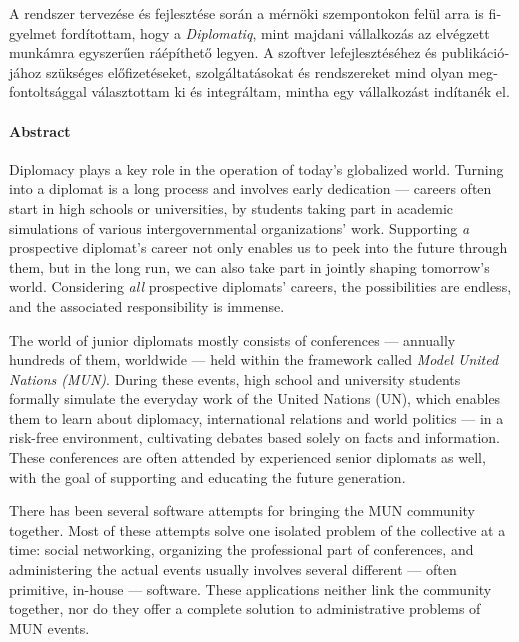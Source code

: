 \begin{otherlanguage}{magyar}
A rendszer tervezése és fejlesztése során a mérnöki szempontokon felül arra is figyelmet fordítottam, hogy a \emph{Diplomatiq}, mint majdani vállalkozás az elvégzett munkámra egyszerűen ráépíthető legyen. A szoftver lefejlesztéséhez és publikációjához szükséges előfizetéseket, szolgáltatásokat és rendszereket mind olyan megfontoltsággal választottam ki és integráltam, mintha egy vállalkozást indítanék el.

\end{otherlanguage}

\clearpage

\paragraph*{Abstract}
{}
\thispagestyle{plain}

Diplomacy plays a key role in the operation of today's globalized world. Turning into a diplomat is a long process and involves early dedication — careers often start in high schools or universities, by students taking part in academic simulations of various intergovernmental organizations' work. Supporting \emph{a} prospective diplomat's career not only enables us to peek into the future through them, but in the long run, we can also take part in jointly shaping tomorrow's world. Considering \emph{all} prospective diplomats' careers, the possibilities are endless, and the associated responsibility is immense.

The world of junior diplomats mostly consists of conferences — annually hundreds of them, worldwide — held within the framework called \emph{Model United Nations (MUN)}. During these events, high school and university students formally simulate the everyday work of the United Nations (UN), which enables them to learn about diplomacy, international relations and world politics — in a risk-free environment, cultivating debates based solely on facts and information. These conferences are often attended by experienced senior diplomats as well, with the goal of supporting and educating the future generation.

There has been several software attempts for bringing the MUN community together. Most of these attempts solve one isolated problem of the collective at a time: social networking, organizing the professional part of conferences, and administering the actual events usually involves several different — often primitive, in-house — software. These applications neither link the community together, nor do they offer a complete solution to administrative problems of MUN events.


